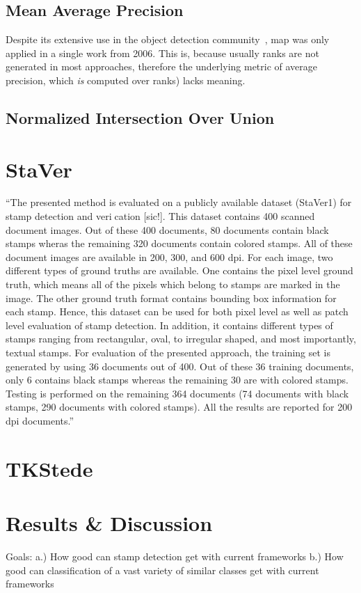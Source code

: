 \subsection{Mean Average Precision}\label{subsect:mAP}
Despite its extensive use in the object detection community~\cite{Liu.2016,Ren.04.06.2015}, 
\Gls{map} was only applied in a single work \cite{Zhu.2006} from 2006. This is,
because usually ranks are not generated in most approaches, therefore the 
underlying metric of average precision, which \textit{is} computed over ranks) 
lacks meaning.

\subsection{Normalized Intersection Over Union}\label{subsect:normalized-iou}
\blindtext[1]

\section{StaVer}\label{sect:staver}
``The presented method is evaluated on a publicly available dataset (StaVer1) for stamp
detection and verication [sic!]. This dataset contains 400 scanned document images. Out
of these 400 documents, 80 documents contain black stamps wheras the remaining 320
documents contain colored stamps. All of these document images are available in 200,
300, and 600 dpi. For each image, two different types of ground truths are available.
One contains the pixel level ground truth, which means all of the pixels which belong to
stamps are marked in the image. The other ground truth format contains bounding box
information for each stamp. Hence, this dataset can be used for both pixel level as well
as patch level evaluation of stamp detection. In addition, it contains different types of
stamps ranging from rectangular, oval, to irregular shaped, and most importantly, textual
stamps.
For evaluation of the presented approach, the training set is generated by using 36 documents
out of 400. Out of these 36 training documents, only 6 contains black stamps
whereas the remaining 30 are with colored stamps. Testing is performed on the remaining
364 documents (74 documents with black stamps, 290 documents with colored stamps).
All the results are reported for 200 dpi documents.''~\cite{Ahmed.2016}

\section{TKStede}\label{sect:tkstede}
\blindtext[1]

\section{Results \& Discussion}\label{sect:results-and-discussion}
Goals: 
    a.) How good can stamp detection get with current frameworks
    b.) How good can classification of a vast variety of similar classes get
        with current frameworks